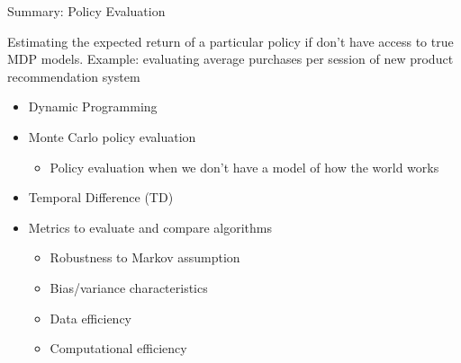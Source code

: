 \documentclass[aspectratio=169]{../latex_main/tntbeamer}  %
\begin{document}
\begin{frame}[c]{Summary: Policy Evaluation}
	
	Estimating the expected return of a particular policy if don’t have access to true MDP models. Example: evaluating average purchases per session of new product recommendation system
	
	\begin{itemize}
		\item Dynamic Programming
		\item Monte Carlo policy evaluation
		\begin{itemize}
			\item Policy evaluation when we don’t have a model of how the world works
		\end{itemize}
		\item Temporal Difference (TD)
		\item Metrics to evaluate and compare algorithms
		\begin{itemize}
			\item Robustness to Markov assumption
			\item Bias/variance characteristics
			\item Data efficiency
			\item Computational efficiency
		\end{itemize}
	\end{itemize}

	
\end{frame}



\end{document}
